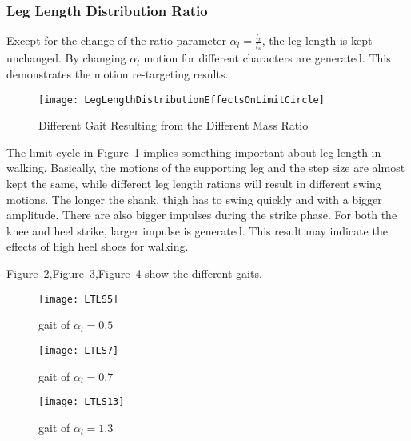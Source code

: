 \subsubsection*{Leg Length Distribution Ratio}
Except for the change of the ratio parameter  $\alpha_l=\frac{l_t}{l_s}$, the leg length is kept unchanged.
By changing $\alpha_l$ motion for different characters are generated.
This demonstrates the motion re-targeting results.


\begin{figure}[!htbp]
  \begin{center}
      \texttt{[image: LegLengthDistributionEffectsOnLimitCircle]}
    \caption{Different Gait Resulting from the Different Mass Ratio}
    \label{fig:differentlr}
\end{center}
\end{figure}

The limit cycle in Figure~\ref{fig:differentlr} implies something important about leg length in walking.
Basically, the  motions of the supporting leg and the step size are almost kept the same, while different leg length rations will result in different swing motions.
The longer the shank, thigh has to swing quickly and with a bigger amplitude.
There are also bigger impulses during the strike phase. 
For both the knee and heel strike, larger impulse is generated.
This result may indicate the effects of high heel shoes for walking.

Figure~\ref{fig:lr1},Figure~\ref{fig:lr2},Figure~\ref{fig:lr3} show the different gaits.
\begin{figure}[!htbp]
  \begin{center}
      \texttt{[image: LTLS5]}
    \caption{gait of $\alpha_l=0.5$}
    \label{fig:lr1}
\end{center}
\end{figure}

\begin{figure}[!htbp]
  \begin{center}
      \texttt{[image: LTLS7]}
    \caption{gait of $\alpha_l=0.7$}
    \label{fig:lr2}
\end{center}
\end{figure}

\begin{figure}[!htbp]
  \begin{center}
      \texttt{[image: LTLS13]}
    \caption{gait of $\alpha_l=1.3$}
    \label{fig:lr3}
\end{center}
\end{figure}





